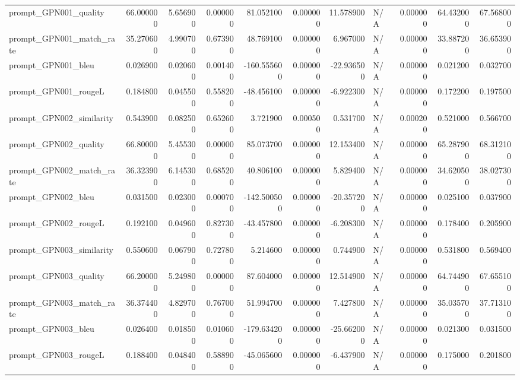 \begin{tabular}{lrrrrrrlrrr}
prompt_GPN001_quality & 66.000000 & 5.656900 & 0.000000 & 81.052100 & 0.000000 & 11.578900 & N/A & 0.000000 & 64.432000 & 67.568000 \\
prompt_GPN001_match_rate & 35.270600 & 4.990700 & 0.673900 & 48.769100 & 0.000000 & 6.967000 & N/A & 0.000000 & 33.887200 & 36.653900 \\
prompt_GPN001_bleu & 0.026900 & 0.020600 & 0.001400 & -160.555600 & 0.000000 & -22.936500 & N/A & 0.000000 & 0.021200 & 0.032700 \\
prompt_GPN001_rougeL & 0.184800 & 0.045500 & 0.558200 & -48.456100 & 0.000000 & -6.922300 & N/A & 0.000000 & 0.172200 & 0.197500 \\
prompt_GPN002_similarity & 0.543900 & 0.082500 & 0.652600 & 3.721900 & 0.000500 & 0.531700 & N/A & 0.000200 & 0.521000 & 0.566700 \\
prompt_GPN002_quality & 66.800000 & 5.455300 & 0.000000 & 85.073700 & 0.000000 & 12.153400 & N/A & 0.000000 & 65.287900 & 68.312100 \\
prompt_GPN002_match_rate & 36.323900 & 6.145300 & 0.685200 & 40.806100 & 0.000000 & 5.829400 & N/A & 0.000000 & 34.620500 & 38.027300 \\
prompt_GPN002_bleu & 0.031500 & 0.023000 & 0.000700 & -142.500500 & 0.000000 & -20.357200 & N/A & 0.000000 & 0.025100 & 0.037900 \\
prompt_GPN002_rougeL & 0.192100 & 0.049600 & 0.827300 & -43.457800 & 0.000000 & -6.208300 & N/A & 0.000000 & 0.178400 & 0.205900 \\
prompt_GPN003_similarity & 0.550600 & 0.067900 & 0.727800 & 5.214600 & 0.000000 & 0.744900 & N/A & 0.000000 & 0.531800 & 0.569400 \\
prompt_GPN003_quality & 66.200000 & 5.249800 & 0.000000 & 87.604000 & 0.000000 & 12.514900 & N/A & 0.000000 & 64.744900 & 67.655100 \\
prompt_GPN003_match_rate & 36.374400 & 4.829700 & 0.767000 & 51.994700 & 0.000000 & 7.427800 & N/A & 0.000000 & 35.035700 & 37.713100 \\
prompt_GPN003_bleu & 0.026400 & 0.018500 & 0.010600 & -179.634200 & 0.000000 & -25.662000 & N/A & 0.000000 & 0.021300 & 0.031500 \\
prompt_GPN003_rougeL & 0.188400 & 0.048400 & 0.588900 & -45.065600 & 0.000000 & -6.437900 & N/A & 0.000000 & 0.175000 & 0.201800 \\
\bottomrule
\end{tabular}
